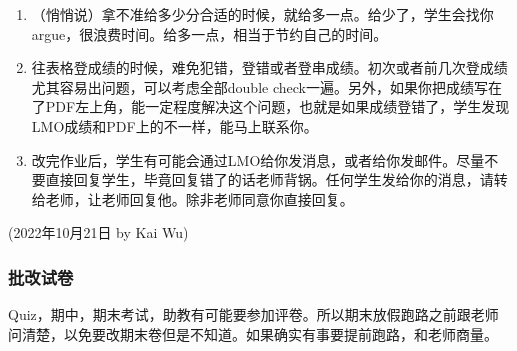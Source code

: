 \begin{enumerate}
    \item （悄悄说）拿不准给多少分合适的时候，就给多一点。给少了，学生会找你argue，很浪费时间。给多一点，相当于节约自己的时间。
    \item 往表格登成绩的时候，难免犯错，登错或者登串成绩。初次或者前几次登成绩尤其容易出问题，可以考虑全部double check一遍。另外，如果你把成绩写在了PDF左上角，能一定程度解决这个问题，也就是如果成绩登错了，学生发现LMO成绩和PDF上的不一样，能马上联系你。
    \item 改完作业后，学生有可能会通过LMO给你发消息，或者给你发邮件。尽量不要直接回复学生，毕竟回复错了的话老师背锅。任何学生发给你的消息，请转给老师，让老师回复他。除非老师同意你直接回复。
\end{enumerate}

\begin{flushright}
    (2022年10月21日 by Kai Wu)
\end{flushright}

\subsubsection{批改试卷}
Quiz，期中，期末考试，助教有可能要参加评卷。所以期末放假跑路之前跟老师问清楚，以免要改期末卷但是不知道。如果确实有事要提前跑路，和老师商量。

